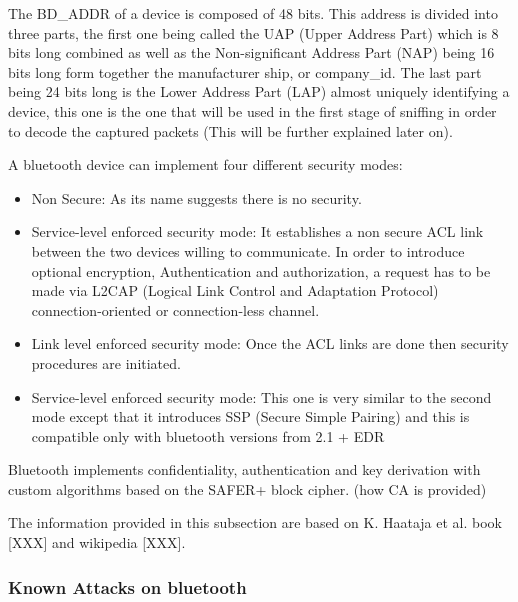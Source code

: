 The BD_ADDR of a device is composed of 48 bits. This address is divided into three parts, the first one being called the UAP (Upper Address Part) which is 8 bits long combined as well as the Non-significant Address Part (NAP) being 16 bits long form together the manufacturer ship, or company_id. The last part being 24 bits long is the Lower Address Part (LAP) almost uniquely identifying a device, this one is the one that will be used in the first stage of sniffing in order to decode the captured packets (This will be further explained later on). 

A bluetooth device can implement four different security modes:
  \begin{itemize}
  	\item Non Secure: As its name suggests there is no security.
  	\item Service-level enforced security mode: It establishes a non secure ACL link between the two devices willing to communicate. In order to introduce optional encryption, Authentication and authorization, a request has to be made via L2CAP (Logical Link Control and Adaptation Protocol) connection-oriented or connection-less channel.
  	\item Link level enforced security mode: Once the ACL links are done then security procedures are initiated.
  	\item Service-level enforced security mode: This one is very similar to the second mode except that it introduces SSP (Secure Simple Pairing) and this is compatible only with bluetooth versions from 2.1 + EDR
  \end{itemize}
 
Bluetooth implements confidentiality, authentication and key derivation with custom algorithms based on the SAFER+ block cipher. (how CA is provided)

The information provided in this subsection are based on K. Haataja et al. book [XXX] and wikipedia [XXX].

\subsubsection{Known Attacks on bluetooth}
















